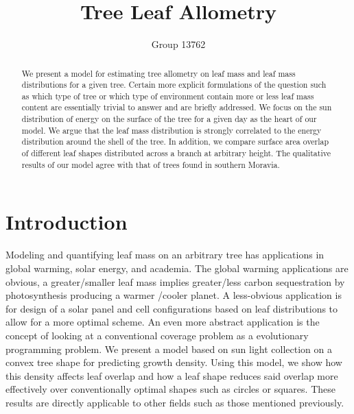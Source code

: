 \documentclass[10pt]{article}
\def \TITLE {Tree Leaf Allometry}
\def \GROUPID {13762}
\numberwithin{equation}{subsection}
\begin{document}

%

\onecolumn
\title{\TITLE}
\author{Group \GROUPID}
\maketitle
{}
\begin{center}
\begin{minipage}{14cm}
\begin{abstract}
  
  
    We present a model for estimating tree allometry on leaf mass and leaf mass
    distributions for a given tree.  Certain more explicit formulations of the
    question such as which type of tree or which type of environment contain
    more or less leaf mass content are essentially trivial to answer and are
    briefly addressed.  We focus on the sun distribution of energy on the
    surface of the tree for a given day as the heart of our model.  We argue
    that the leaf mass distribution is strongly correlated to the energy
    distribution around the shell of the tree.  In addition, we compare surface
    area overlap of different leaf shapes distributed across a branch at
    arbitrary height.  The qualitative results of our model agree with that of
    trees found in southern Moravia. \citep{sunLeaf01}

\end{abstract}
\end{minipage}
\end{center}

\onecolumn


\tableofcontents
\listoffigures
\listoftables
\twocolumn
{}

\section{Introduction}

Modeling and quantifying leaf mass on an arbitrary tree has
applications in global warming, solar energy, and academia.  The
global warming applications are obvious, a greater/smaller leaf mass
implies greater/less carbon sequestration by photosynthesis producing
a warmer /cooler planet.  A less-obvious application is for design of
a solar panel and cell configurations based on leaf distributions to
allow for a more optimal scheme.  An even more abstract application is
the concept of looking at a conventional coverage problem as a
evolutionary programming problem.  We present a model based on sun
light collection on a convex tree shape for predicting growth density.
Using this model, we show how this density affects leaf overlap and
how a leaf shape reduces said overlap more effectively over
conventionally optimal shapes such as circles or squares.  These
results are directly applicable to other fields such as those
mentioned previously.
\end{document}
